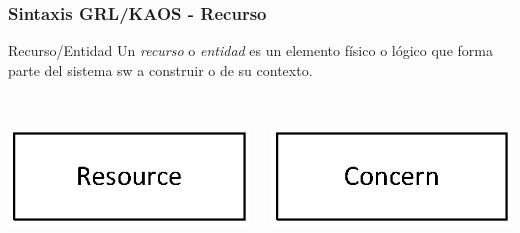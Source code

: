 \documentclass[handout,slidestop,xcolor=pst,dvips,blue]{beamer}
\begin{document}
\begin{frame}[c]
    \frametitle{Sintaxis GRL/KAOS - Recurso}
    \begin{block}{Recurso/Entidad}
        Un \alert{\emph{recurso}} o \alert{\emph{entidad}} es un elemento físico o lógico que forma parte del sistema sw a construir o de su contexto.
        \ \\
        \ \\
        \begin{columns}[c]
            \begin{column}{0.50\linewidth}
                \centering \includegraphics[width=0.5\columnwidth,keepaspectratio=true]{images/objetivos/resource(GRL).eps}
            \end{column}
            \begin{column}{0.50\linewidth}
                \centering \includegraphics[width=0.5\columnwidth,keepaspectratio=true]{images/objetivos/concern(KAOS).eps}
            \end{column}
        \end{columns}
    \end{block}
\end{frame}
\end{document}
